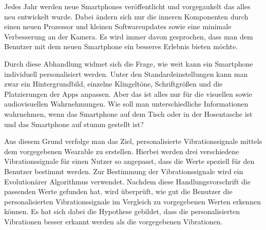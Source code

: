 
Jedes Jahr werden neue Smartphones ver{\"o}ffentlicht und vorgegaukelt das alles neu entwickelt wurde. Dabei {\"a}ndern sich nur die inneren Komponenten durch einen neuen Prozessor und kleinen Softwareupdates sowie eine minimale Verbesserung an der Kamera. 
Es wird immer davon gesprochen, dass man dem Benutzer mit dem neuen Smartphone ein besseres Erlebnis bieten m{\"o}chte. 


Durch diese Abhandlung widmet sich die Frage, wie weit kann ein Smartphone individuell personalisiert werden. 
Unter den Standardeinstellungen kann man zwar ein Hintergrundbild, einzelne Klingelt{\"o}ne, Schriftgr{\"o}{\ss}en und die Platzierungen der Apps anpassen. 
Aber das ist alles nur f{\"u}r die visuellen sowie audiovisuellen Wahrnehmungen. 
Wie soll man unterschiedliche Informationen wahrnehmen, wenn das Smartphone auf dem Tisch oder in der Hosentasche ist und das Smartphone auf stumm gestellt ist? 

Aus diesem Grund verfolge man das Ziel, personalisierte Vibrationssignale mittels dem vorgegebenen Wearable zu erstellen.
Hierbei werden drei verschiedene Vibrationssignale f{\"u}r einen Nutzer so angepasst, dass die Werte speziell f{\"u}r den Benutzer bestimmt werden. 
Zur Bestimmung der Vibrationssignale wird ein Evolution{\"a}rer Algorithmus verwendet. Nachdem diese Handlungsvorschrift die passenden Werte gefunden hat, wird {\"u}berpr{\"u}ft, wie gut die Benutzer die personalisierten Vibrationssignale im Vergleich zu vorgegebenen Werten erkennen können.
Es hat sich dabei die Hypothese gebildet, dass die personalisierten Vibrationen besser erkannt werden als die vorgegebenen Vibrationen.



